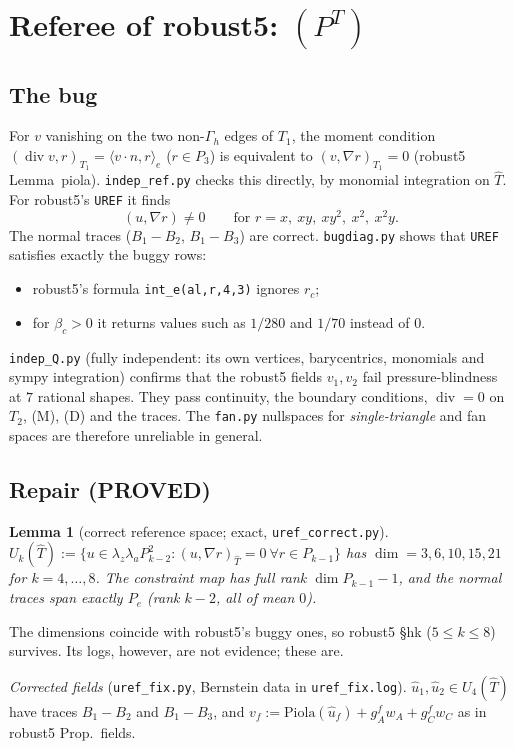 \documentclass[11pt]{article}
\newtheorem{lemma}[theorem]{Lemma}
\theoremstyle{remark}
\newcommand{\Gh}{\Gamma_h}
\newcommand{\ip}[2]{\langle #1,#2\rangle}
\begin{document}
\section{Referee of robust5: $(P^T)$}
\subsection{The bug}
For $v$ vanishing on the two non-$\Gh$ edges of $T_1$, the moment condition $(\operatorname{div}v,r)_{T_1}=\ip{v\cdot n}r_e$
($r\in P_3$) is equivalent to $(v,\nabla r)_{T_1}=0$ (robust5 Lemma~piola). \texttt{indep\_ref.py} checks this directly, by
monomial integration on $\hat T$. For robust5's \texttt{UREF} it finds
\[
(u,\nabla r)\ne0\qquad\text{for }r=x,\ xy,\ xy^2,\ x^2,\ x^2y .
\]
The normal traces ($B_1-B_2$, $B_1-B_3$) are correct. \texttt{bugdiag.py} shows that \texttt{UREF} satisfies exactly the buggy rows:
\begin{itemize}
\item robust5's formula \texttt{int\_e(al,r,4,3)} ignores $r_c$;
\item for $\beta_c>0$ it returns values such as $1/280$ and $1/70$ instead of $0$.
\end{itemize}
\texttt{indep\_Q.py} (fully independent: its own vertices, barycentrics, monomials and sympy integration) confirms that
the robust5 fields $v_1,v_2$ fail pressure-blindness at $7$ rational shapes. They pass continuity, the boundary conditions,
$\operatorname{div}=0$ on $T_2$, (M), (D) and the traces. The \texttt{fan.py} nullspaces for \emph{single-triangle} and fan spaces are
therefore unreliable in general.

\subsection{Repair (PROVED)}
\begin{lemma}[correct reference space; exact, \texttt{uref\_correct.py}]
$U_k(\hat T):=\{u\in\lambda_z\lambda_aP_{k-2}^2:(u,\nabla r)_{\hat T}=0\ \forall r\in P_{k-1}\}$ has
$\dim=3,6,10,15,21$ for $k=4,\dots,8$. The constraint map has full rank $\dim P_{k-1}-1$, and the normal traces span exactly
$P_e$ (rank $k-2$, all of mean $0$).
\end{lemma}
The dimensions coincide with robust5's buggy ones, so robust5 \S hk ($5\le k\le8$) survives. Its logs, however, are not evidence;
these are.

\noindent\emph{Corrected fields} (\texttt{uref\_fix.py}, Bernstein data in \texttt{uref\_fix.log}). $\hat u_1,\hat u_2\in U_4(\hat T)$ have traces
$B_1-B_2$ and $B_1-B_3$, and $v_f:=\mathrm{Piola}(\hat u_f)+g_A^fw_A+g_C^fw_C$ as in robust5 Prop.~fields.
\end{document}
